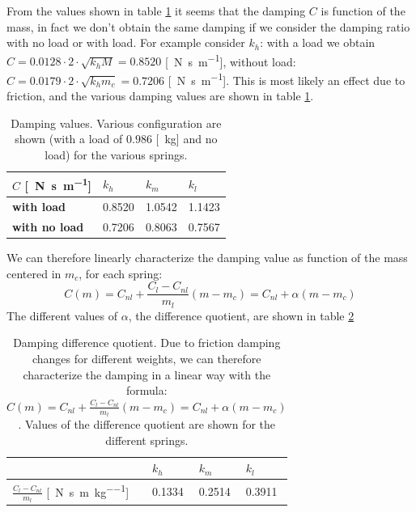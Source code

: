 From the values shown in table \ref{table:cart_detached_damping} it seems that the damping $C$ is function of the mass, in fact we don't obtain the same damping if we consider the damping ratio with no load or with load. For example consider $k_h$: with a load we obtain $C= 0.0128\cdot2\cdot\sqrt{k_h M}=0.8520$ [\SI{}{\newton \second \per \metre}], without load: $C=0.0179\cdot2\cdot\sqrt{k_h m_c}=0.7206$ [\SI{}{\newton \second \per \metre}]. This is most likely an effect due to friction, and the various damping values are shown in table 
\ref{table:cart_detached_damping}.
\begin{table}[!h]
\centering

\begin{tabular}{|l|l|l|l|}
\hline
{$C$ [\SI{}{\newton \second \per \metre}]} & \textbf{$k_h$} & \textbf{$k_m$}   & \textbf{$k_l$}   \\ \hline
\textbf{with load}         &0.8520    & 1.0542 & 1.1423 \\ \hline
\textbf{with no load}     &0.7206    & 0.8063 & 0.7567      \\ \hline
\end{tabular}
\caption{Damping values. Various configuration are shown (with a load of $0.986$ [\SI{}{\kilo \gram}] and no load) for the various springs. }
\label{table:cart_detached_damping}
\end{table}

We can therefore linearly characterize the damping value as function of the mass centered in $m_c$, for each spring:
$$C(m)=C_{nl}+ \frac{C_{l}-C_{nl}}{m_{l}}(m -m_{c}) = C_{nl} +\alpha (m-m_{c})$$
The different values of $\alpha$, the difference quotient, are shown in table \ref{table:cart_detached_damping_quotient}

\begin{table}[!h]
\centering

\begin{tabular}{|l|l|l|l|}
\hline
 & \textbf{$k_h$} & \textbf{$k_m$}   & \textbf{$k_l$}   \\ \hline
$\frac{C_{l}-C_{nl}}{m_{l}}$ [\SI{}{\newton \second \per \metre \per \kilo\gram}]       &0.1334   & 0.2514 & 0.3911 \\ \hline
\end{tabular}

\caption{Damping difference quotient. Due to friction damping changes for different weights, we can therefore characterize the damping in a linear way with the formula: $C(m)=C_{nl}+ \frac{C_{l}-C_{nl}}{m_{l}}(m -m_{c})= C_{nl} +\alpha (m-m_{c})$. Values of the difference quotient are shown for the different springs.}
\label{table:cart_detached_damping_quotient}
\end{table}



